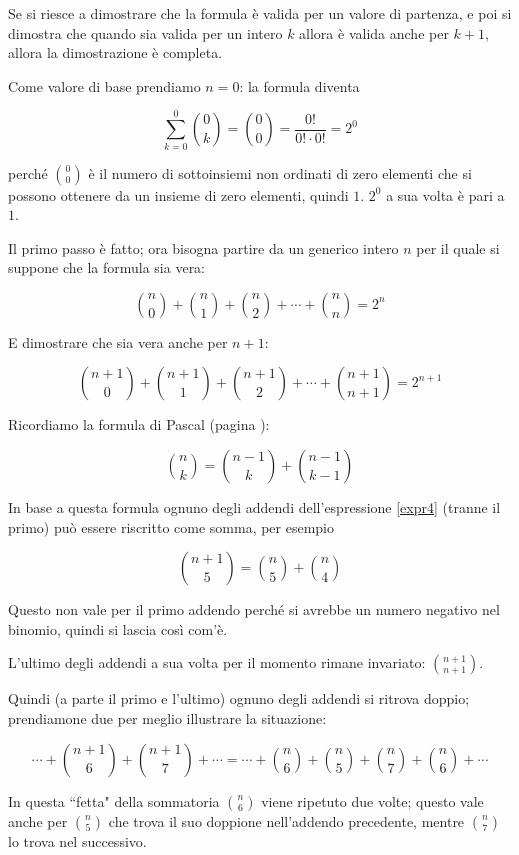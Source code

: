 Se si riesce a dimostrare che la formula è valida per un valore di partenza, e poi si dimostra che quando sia valida per un intero $k$ allora è valida anche per $k+1$, allora la dimostrazione è completa.

Come valore di base prendiamo $n=0$: la formula diventa 

\[
\sum_{k=0}^{0}{\binom{0}{k}}=\binom{0}{0}=\frac{0!}{0!\cdot0!}=2^0
\]

perché ${0 \choose 0}$ è il numero di sottoinsiemi non ordinati di zero elementi che si possono ottenere da un insieme di zero elementi, quindi $1$.  $2^0$ a sua volta è pari a $1$.

Il primo passo è fatto; ora bisogna partire da un generico intero $n$ per il quale si suppone che la formula sia vera:

\[
\binom{n}{0} + \binom{n}{1} + \binom{n}{2} + \cdots + \binom{n}{n} = 2^n
\]

E dimostrare che sia vera anche per $n+1$:


\begin{equation}\label{expr4}
\binom{n+1}{0} + \binom{n+1}{1} + \binom{n+1}{2} + \cdots + \binom{n+1}{n+1} = 2^{n+1}
\end{equation}

Ricordiamo la formula di Pascal (pagina \pageref{formula_pascal}):


\[
{n \choose k}={n-1 \choose k}+{n-1 \choose k-1}
\]

In base a questa formula ognuno degli addendi dell'espressione \ref{expr4} (tranne il primo) può essere riscritto come somma, per esempio


\[
{n+1 \choose 5}={n \choose 5}+{n \choose 4}
\]

Questo non vale per il primo addendo perché si avrebbe un numero negativo nel binomio, quindi si lascia così com'è.

L'ultimo degli addendi a sua volta per il momento rimane invariato: ${n+1\choose n+1}$.

Quindi (a parte il primo e l'ultimo) ognuno degli addendi si ritrova doppio; prendiamone due per meglio illustrare la situazione:

\[
\cdots+{n+1\choose 6}+{n+1\choose 7}+\cdots
=
\cdots+{n\choose 6}+{n \choose 5}+{n\choose 7}+{n\choose 6}+\cdots
\]

In questa ``fetta" della sommatoria ${n\choose 6}$ viene ripetuto due volte; questo vale anche per ${n\choose 5}$ che trova il suo doppione nell'addendo precedente, mentre ${n \choose 7}$ lo trova nel successivo.

